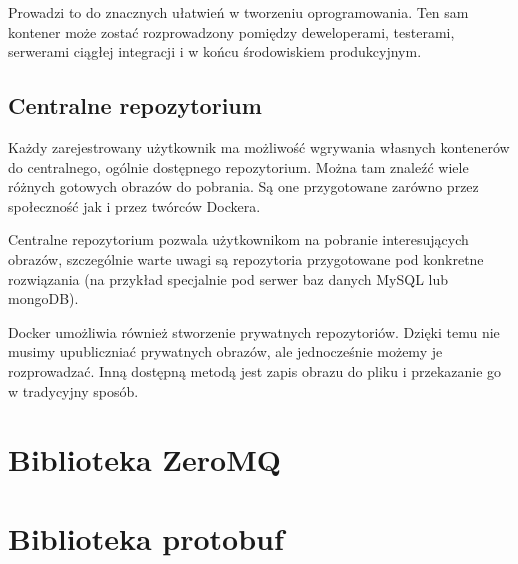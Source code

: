 \par{Prowadzi to do znacznych ułatwień w tworzeniu oprogramowania. Ten sam kontener może zostać rozprowadzony pomiędzy deweloperami, testerami, serwerami ciągłej integracji i w końcu środowiskiem produkcyjnym. }

\subsection[Centralne repozytorium]{Centralne repozytorium}

\par{Każdy zarejestrowany użytkownik ma możliwość wgrywania własnych kontenerów do centralnego, ogólnie dostępnego repozytorium. Można tam znaleźć wiele różnych gotowych obrazów do pobrania. Są one przygotowane zarówno przez społeczność jak i przez twórców Dockera. }

\par{Centralne repozytorium pozwala użytkownikom na pobranie interesujących obrazów, szczególnie warte uwagi są repozytoria przygotowane pod konkretne rozwiązania (na przykład specjalnie pod serwer baz danych MySQL lub mongoDB). }

\par{Docker umożliwia również stworzenie prywatnych repozytoriów. Dzięki temu nie musimy upubliczniać prywatnych obrazów, ale jednocześnie możemy je rozprowadzać. Inną dostępną metodą jest zapis obrazu do pliku i przekazanie go w tradycyjny sposób. }


\section{Biblioteka ZeroMQ}

\section{Biblioteka protobuf}
